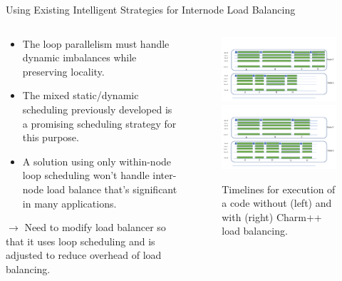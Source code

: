 \begin{frame}{Using Existing Intelligent Strategies for Internode Load Balancing}
\begin{columns}
\begin{column}{0.5\textwidth}
\begin{itemize}
\small \item \small The loop parallelism must handle dynamic imbalances while preserving locality.
\item \small The mixed static/dynamic scheduling previously developed is a promising scheduling strategy for this purpose.
\item \small A solution using only within-node loop scheduling won't handle inter-node load balance that's significant in many applications.
\end{itemize}
{\small $\rightarrow$ Need to modify load balancer so that it uses loop scheduling and is adjusted to reduce overhead of load balancing.}
\end{column} 

\begin{column}{0.5\textwidth}
\begin{figure}[ht!] \label{fig:charmBeforeAndAfterLdBCkLoop}
  \begin{center}
    \includegraphics[width=.8\columnwidth]{images/charmLdbWithLoopwCharmonly-unbalanced}\\
    \includegraphics[width=.8\columnwidth]{images/charmLdbWithLoopwCharmonly-balanced}
  \end{center}
  \caption{\label{fig:charmBeforeAndAfterLdBCkLoop} \small Timelines for execution of a code without (left) and with (right) Charm++ load balancing.}
\end{figure}
\end{column}
\end{columns}
\end{frame}

